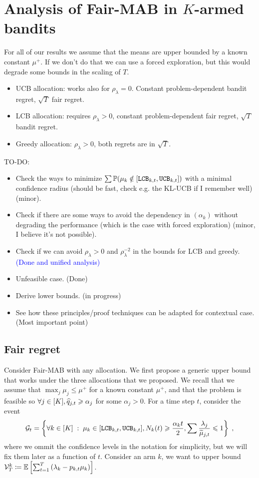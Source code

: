 \section{Analysis of Fair-MAB in $K$-armed bandits}\label{app::K_armed}

For all of our results we assume that the means are upper bounded by a known constant $\mu^+$. If we don't do that we can use a forced exploration, but this would degrade some bounds in the scaling of $T$.
\begin{itemize}
	\item UCB allocation: works also for $\rho_\lambda=0$. Constant problem-dependent bandit regret, $\sqrt{T}$ fair regret.	
	\item LCB allocation: requires $\rho_\lambda>0$, constant problem-dependent fair regret, $\sqrt{T}$ bandit regret.
	\item Greedy allocation: $\rho_\lambda>0$, both regrets are in $\sqrt{T}$. 
\end{itemize}

TO-DO:
\begin{itemize}
	\item Check the ways to minimize $\sum \mathbb{P}(\mu_k \notin [\texttt{LCB}_{k,t}, \texttt{UCB}_{k, t}])$ with a minimal confidence radius (should be fast, check e.g. the KL-UCB if I remember well) (minor).
	\item Check if there are some ways to avoid the dependency in $(\alpha_k)$ without degrading the performance (which is the case with forced exploration) (minor, I believe it's not possible).
	\item Check if we can avoid $\rho_\lambda>0$ and $\rho_\lambda^{-2}$ in the bounds for LCB and greedy. \textcolor{blue}{(Done and unified analysis)}
	\item Unfeasible case. (Done)
	\item Derive lower bounds. (in progress)
	\item See how these principles/proof techniques can be adapted for contextual case. (Most important point)
\end{itemize}


\subsection{Fair regret}

Consider Fair-MAB with any allocation. We first propose a generic upper bound that works under the three allocations that we proposed. We recall that we assume that $\max_j \mu_j \leq \mu^+$ for a known constant $\mu^+$, and that the problem is feasible so $\forall j \in [K], \widehat{q}_{j,t}  \geqslant \alpha_j$ for some $\alpha_j>0$. For a time step $t$, consider the event \[\mathcal{G}_t=\left\{ \forall k \in [K]\;:\; \mu_k \in [\texttt{LCB}_{k, t}, \texttt{UCB}_{k, t}], N_k(t)\geqslant \frac{\alpha_kt}{2}, \sum\frac{\lambda_j}{\widetilde{\mu}_{j,t}} \leqslant 1 \right\}\;,\]
 where we ommit the confidence levels in the notation for simplicity, but we will fix them later as a function of $t$. Consider an arm $k$, we want to upper bound $\mathcal{V}_T^k \coloneqq \mathbb{E}\left[\sum_{t=1}^T \left(\lambda_k-p_{k,t} \mu_k \right)\right]$.
 
